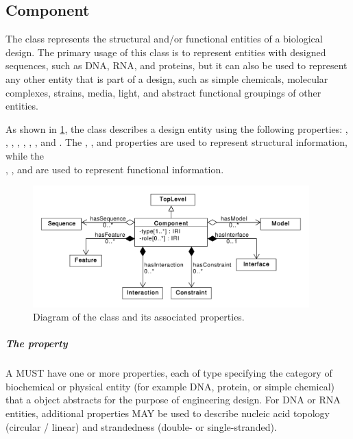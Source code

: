 \subsection{Component}
\label{sec:Component}

The  class represents the structural and/or functional entities of a biological design. The primary usage of this class is to represent entities with designed sequences, such as DNA, RNA, and proteins, but it can also be used to represent any other entity that is part of a design, such as simple chemicals, molecular complexes, strains, media, light, and abstract functional groupings of other entities.

As shown in \ref{uml:component}, the  class describes a design entity using the following properties: , , , , , , , and .  
The , , and  properties are used to represent structural information, while the\\ , , and  are used to represent functional information.

\begin{figure}[ht]
\begin{center}
\includegraphics[width=0.95\textwidth]{uml/component}
\caption[]{Diagram of the  class and its associated properties.}
\label{uml:component}
\end{center}
\end{figure} 

\subparagraph{The  property}
\label{sec:type:C}

A  MUST have one or more  properties, each of type  specifying the category of biochemical or physical entity (for example DNA, protein, or simple chemical) that a  object abstracts
for the purpose of engineering design. For DNA or RNA entities, additional  properties MAY be used to describe nucleic acid topology (circular / linear) and strandedness (double- or single-stranded).

